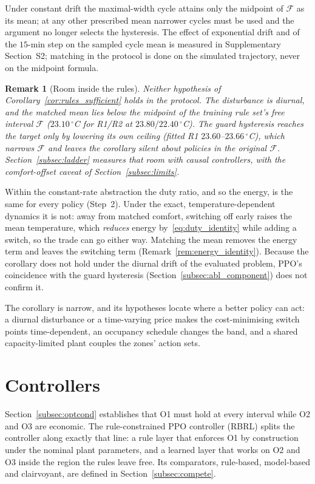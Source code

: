 \documentclass[pdflatex,sn-mathphys-num,iicol]{sn-jnl}
\theoremstyle{thmstyleone}\newtheorem{proposition}{Proposition}\newtheorem{corollary}{Corollary}
\theoremstyle{thmstyletwo}\newtheorem{remark}{Remark}\newtheorem{observation}{Observation}
\theoremstyle{thmstylethree}\newtheorem{definition}{Definition}
\begin{document}
Under constant drift the maximal-width cycle attains only the midpoint of $\mathcal{F}$ as its mean; at any other prescribed mean narrower cycles must be used and the argument no longer selects the hysteresis. The effect of exponential drift and of the $15$-min step on the sampled cycle mean is measured in Supplementary Section~S2; matching in the protocol is done on the simulated trajectory, never on the midpoint formula.

\begin{remark}[Room inside the rules]
\label{rem:cor_scope}
Neither hypothesis of Corollary~\ref{cor:rules_sufficient} holds in the protocol. The disturbance is diurnal, and the matched mean lies below the midpoint of the training rule set's free interval $\mathcal{F}$ ($23.10\,^\circ$C for R1/R2 at $23.80/22.40\,^\circ$C). The guard hysteresis reaches the target only by lowering its own ceiling (fitted R1 $23.60$--$23.66\,^\circ$C), which narrows $\mathcal{F}$ and leaves the corollary silent about policies in the original $\mathcal{F}$. Section~\ref{subsec:ladder} measures that room with causal controllers, with the comfort-offset caveat of Section~\ref{subsec:limits}.
\end{remark}

Within the constant-rate abstraction the duty ratio, and so the energy, is the same for every policy (Step~2). Under the exact, temperature-dependent dynamics it is not: away from matched comfort, switching off early raises the mean temperature, which \emph{reduces} energy by~\eqref{eq:duty_identity} while adding a switch, so the trade can go either way. Matching the mean removes the energy term and leaves the switching term (Remark~\ref{rem:energy_identity}). Because the corollary does not hold under the diurnal drift of the evaluated problem, PPO's coincidence with the guard hysteresis (Section~\ref{subsec:abl_component}) does not confirm it.

The corollary is narrow, and its hypotheses locate where a better policy can act: a diurnal disturbance or a time-varying price makes the cost-minimising switch points time-dependent, an occupancy schedule changes the band, and a shared capacity-limited plant couples the zones' action sets.

 
\section{Controllers}
\label{sec:method}

Section~\ref{subsec:optcond} establishes that O1 must hold at every interval while O2 and O3 are economic. The rule-constrained PPO controller (RBRL) splits the controller along exactly that line: a rule layer that enforces O1 by construction under the nominal plant parameters, and a learned layer that works on O2 and O3 inside the region the rules leave free. Its comparators, rule-based, model-based and clairvoyant, are defined in Section~\ref{subsec:compete}.
 
\end{document}
